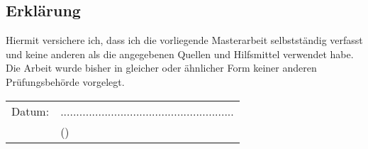 \begin{center}
	\chapter*{Erklärung}
	\vspace{1cm}

	\normalsize Hiermit versichere ich, dass ich die vorliegende Masterarbeit selbstständig verfasst und keine anderen als die angegebenen Quellen und Hilfsmittel verwendet  habe. Die Arbeit wurde bisher in gleicher oder ähnlicher Form keiner anderen Prüfungsbehörde vorgelegt.

    \vspace{2cm}

	\begin{tabular}{p{15em}p{15em}}
		Datum: &  .......................................................\\
			   & \centering (\studentName)\\
	\end{tabular}
\end{center}
